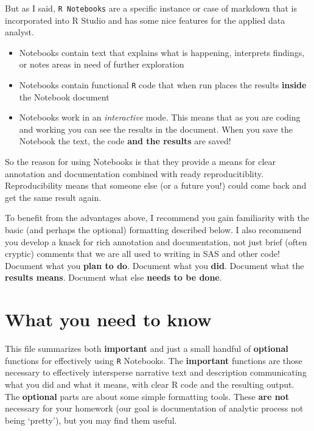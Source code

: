 \documentclass[
]{book}
\newcommand{\passthrough}[1]{#1}
\providecommand{\tightlist}{%
  \setlength{\itemsep}{0pt}\setlength{\parskip}{0pt}}
\begin{document}
But as I said, \passthrough{\lstinline!R Notebooks!} are a specific instance or case of markdown that is incorporated into R Studio and has some nice features for the applied data analyst.

\begin{itemize}
\tightlist
\item
  Notebooks contain text that explains what is happening, interprets findings, or notes areas in need of further exploration
\item
  Notebooks contain functional \passthrough{\lstinline!R!} code that when run places the results \textbf{inside} the Notebook document
\item
  Notebooks work in an \emph{interactive} mode. This means that as you are coding and working you can see the results in the document. When you save the Notebook the text, the code \textbf{and the results} are saved!
\end{itemize}

So the reason for using Notebooks is that they provide a means for clear annotation and documentation combined with ready reproducitiblity. Reproducibility means that someone else (or a future you!) could come back and get the same result again.

To benefit from the advantages above, I recommend you gain familiarity with the basic (and perhaps the optional) formatting described below. I also recommend you develop a knack for rich annotation and documentation, not just brief (often cryptic) comments that we are all used to writing in SAS and other code! Document what you \textbf{plan to do}. Document what you \textbf{did}. Document what the \textbf{results means}. Document what else \textbf{needs to be done}.

\hypertarget{what-you-need-to-know}{%
\section*{What you need to know}\label{what-you-need-to-know}}

This file summarizes both \textbf{important} and just a small handful of \textbf{optional} functions for effectively using \passthrough{\lstinline!R!} Notebooks. The \textbf{important} functions are those necessary to effectively intersperse narrative text and description communicating what you did and what it means, with clear R code and the resulting output. The \textbf{optional} parts are about some simple formatting tools. These \textbf{are not} necessary for your homework (our goal is documentation of analytic process not being `pretty'), but you may find them useful.
\end{document}
